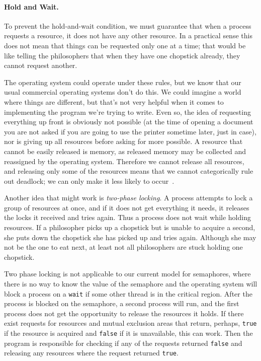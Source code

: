 \documentclass[a4paper]{report}
\begin{document}
\paragraph{Hold and Wait.} To prevent the hold-and-wait condition, we must guarantee that when a process requests a resource, it does not have any other resource. In a practical sense this does not mean that things can be requested only one at a time; that would be like telling the philosophers that when they have one chopstick already, they cannot request another.

The operating system could operate under these rules, but we know that our usual commercial operating systems don't do this. We could imagine a world where things are different, but that's not very helpful when it comes to implementing the program we're trying to write. Even so, the idea of requesting everything up front is obviously not possible (at the time of opening a document you are not asked if you are going to use the printer sometime later, just in case), nor is giving up all resources before asking for more possible. A resource that cannot be easily released is memory, as released memory may be collected and reassigned by the operating system. Therefore we cannot release all resources, and releasing only some of the resources means that we cannot categorically rule out deadlock; we can only make it less likely to occur~\cite{mte241}.

Another idea that might work is \textit{two-phase locking}. A process attempts to lock a group of resources at once, and if it does not get everything it needs, it releases the locks it received and tries again. Thus a process does not wait while holding resources. If a philosopher picks up a chopstick but is unable to acquire a second, she puts down the chopstick she has picked up and tries again. Although she may not be the one to eat next, at least not all philosophers are stuck holding one chopstick.

Two phase locking is not applicable to our current model for semaphores, where there is no way to know the value of the semaphore and the operating system will block a process on a \texttt{wait} if some other thread is in the critical region. After the process is blocked on the semaphore, a second process will run, and the first process does not get the opportunity to release the resources it holds. If there exist requests for resources and mutual exclusion areas that return, perhaps, \texttt{true} if the resource is acquired and \texttt{false} if it is unavailable, this can work. Then the program is responsible for checking if any of the requests returned \texttt{false} and releasing any resources where the request returned \texttt{true}.
\end{document}
